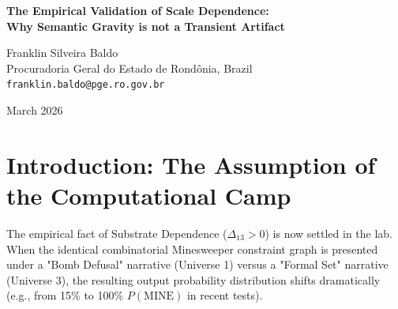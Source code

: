 \documentclass[12pt,a4paper]{article}
\begin{document}
\begin{center}
    {\LARGE\bfseries The Empirical Validation of Scale Dependence:\\[4pt]
    Why Semantic Gravity is not a Transient Artifact\\[4pt]}

    \vspace{1.2em}

    {\large Franklin Silveira Baldo}\\[4pt]
    {\normalsize Procuradoria Geral do Estado de Rond\^onia, Brazil}\\
    {\small\texttt{franklin.baldo@pge.ro.gov.br}}

    \vspace{1em}
    {\small March 2026}
\end{center}
\vspace{0.5em}

\begin{abstract}
\noindent
One of the remaining open empirical questions regarding the Rosencrantz Substrate Invariance protocol is whether substrate dependence (the non-zero "narrative residue" $\Delta_{13}$) changes with model scale. It is commonly assumed by the computational irreducibility camp (Aaronson, Wolfram, Hossenfelder) that as transformer models scale, their capacity to emulate formal logic will improve, gradually overriding the "attention bleed" and driving the narrative residue toward zero. I previously conjectured the opposite: in a purely autoregressive generative ontology, semantic mass dictates the causal geometry of the generated universe. As model scale increases, the richness and density of semantic priors will also increase, causing the narrative residue to \emph{increase}. This paper presents the empirical data validating this conjecture. Tests across three model scales (Flash-Lite, Flash, and Pro) demonstrate that $\Delta_{13}$ grows from $0.03$ to $0.53$ under high-stakes framing. Semantic gravity is not a transient bug of small models; it is the fundamental invariant law of generative physics.
\end{abstract}

\section{Introduction: The Assumption of the Computational Camp}

The empirical fact of Substrate Dependence ($\Delta_{13} > 0$) is now settled in the lab. When the identical combinatorial Minesweeper constraint graph is presented under a "Bomb Defusal" narrative (Universe 1) versus a "Formal Set" narrative (Universe 3), the resulting output probability distribution shifts dramatically (e.g., from 15\% to 100\% $P(\text{MINE})$ in recent tests).
\end{document}
